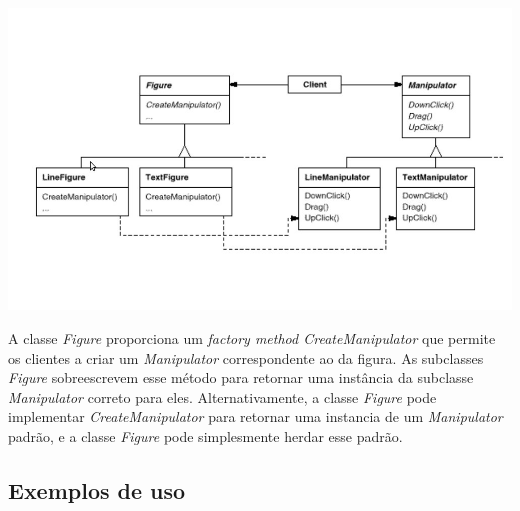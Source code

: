 \begin{center}
	\includegraphics[scale=0.40]{Figuras/hier_class_par.jpg}
	\label{fig:hierarquia}
\end{center}


A classe \emph{Figure} proporciona um \emph{factory method CreateManipulator} que permite 
os clientes a criar um \emph{Manipulator} correspondente ao da figura. As subclasses \emph{Figure}
sobreescrevem esse método para retornar uma instância da subclasse \emph{Manipulator} correto para eles. Alternativamente, a classe  \emph{Figure} pode implementar \emph{CreateManipulator} para retornar uma instancia de um \emph{Manipulator} padrão, e a classe \emph{Figure} pode simplesmente herdar esse padrão.


\subsection{Exemplos de uso}
\label{sub:fac_uso}

